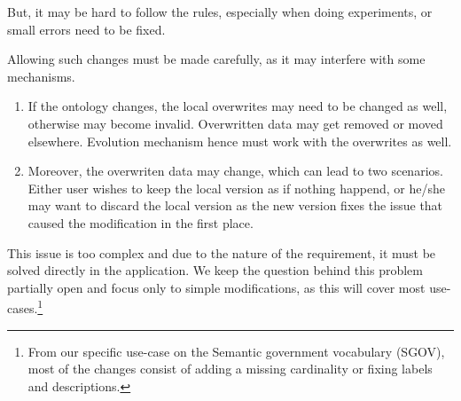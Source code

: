 But, it may be hard to follow the rules, especially when doing experiments, or small errors need to be fixed.

Allowing such changes must be made carefully, as it may interfere with some mechanisms.
\begin{enumerate}
  \item If the ontology changes, the local overwrites may need to be changed as well, otherwise may become invalid. Overwritten data may get removed or moved elsewhere. Evolution mechanism hence must work with the overwrites as well.
  \item Moreover, the overwriten data may change, which can lead to two scenarios. Either user wishes to keep the local version as if nothing happend, or he/she may want to discard the local version as the new version fixes the issue that caused the modification in the first place.
\end{enumerate}

This issue is too complex and due to the nature of the requirement, it must be solved directly in the application. We keep the question behind this problem partially open and focus only to simple modifications, as this will cover most use-cases.\footnote{From our specific use-case on the Semantic government vocabulary (SGOV), most of the changes consist of adding a missing cardinality or fixing labels and descriptions.}